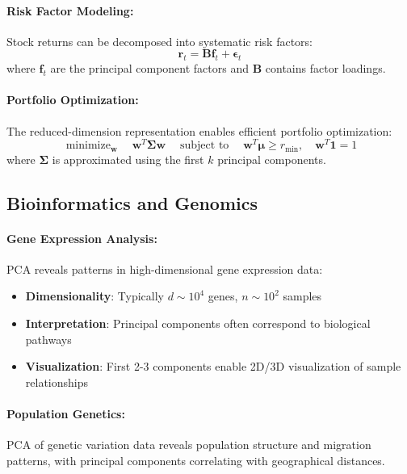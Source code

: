 \documentclass[12pt]{article}
\renewcommand{\vec}[1]{\mathbf{#1}}
\DeclareMathOperator{\minimize}{minimize}
\DeclareMathOperator{\subject}{subject\ to}
\begin{document}
\paragraph{Risk Factor Modeling:}
Stock returns can be decomposed into systematic risk factors:
\begin{equation}
    \vec{r}_t = \vec{B}\vec{f}_t + \vec{\epsilon}_t
\end{equation}
where $\vec{f}_t$ are the principal component factors and $\vec{B}$ contains factor loadings.

\paragraph{Portfolio Optimization:}
The reduced-dimension representation enables efficient portfolio optimization:
\begin{equation}
    \minimize_{\vec{w}} \quad \vec{w}^T\vec{\Sigma}\vec{w} \quad \subject \quad \vec{w}^T\vec{\mu} \geq r_{\min}, \quad \vec{w}^T\vec{1} = 1
\end{equation}
where $\vec{\Sigma}$ is approximated using the first $k$ principal components.

\subsection{Bioinformatics and Genomics}

\paragraph{Gene Expression Analysis:}
PCA reveals patterns in high-dimensional gene expression data:
\begin{itemize}[noitemsep]
    \item \textbf{Dimensionality}: Typically $d \sim 10^4$ genes, $n \sim 10^2$ samples
    \item \textbf{Interpretation}: Principal components often correspond to biological pathways
    \item \textbf{Visualization}: First 2-3 components enable 2D/3D visualization of sample relationships
\end{itemize}

\paragraph{Population Genetics:}
PCA of genetic variation data reveals population structure and migration patterns, with principal components correlating with geographical distances.

\newpage
\end{document}
